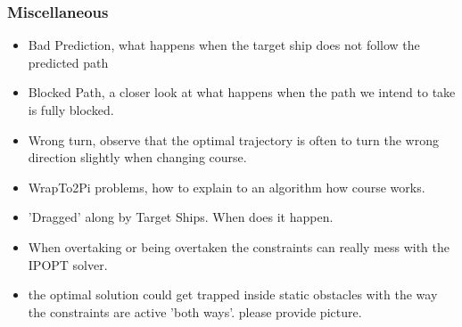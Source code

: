 \subsubsection{Miscellaneous}
\begin{itemize}
    \item Bad Prediction, what happens when the target ship does not follow the predicted path
    \item Blocked Path, a closer look at what happens when the path we intend to take is fully blocked.
    \item Wrong turn, observe that the optimal trajectory is often to turn the wrong direction slightly when changing course.
    \item WrapTo2Pi problems, how to explain to an algorithm how course works.
    \item 'Dragged' along by Target Ships. When does it happen.
    \item When overtaking or being overtaken the constraints can really mess with the \gls{IPOPT} solver.
    \item the optimal solution could get trapped inside static obstacles with the way the constraints are active 'both ways'. please provide picture.
\end{itemize}

